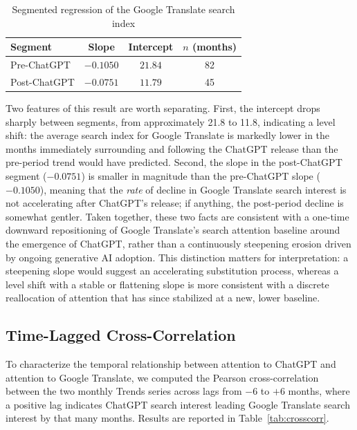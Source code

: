 \documentclass[11pt]{article}
\begin{document}
\begin{table}[htbp]
\centering
\caption{Segmented regression of the Google Translate search index}
\label{tab:segmented}
\begin{tabular}{lccc}
\toprule
Segment & Slope & Intercept & $n$ (months) \\
\midrule
Pre-ChatGPT  & $-0.1050$ & $21.84$ & 82 \\
Post-ChatGPT & $-0.0751$ & $11.79$ & 45 \\
\bottomrule
\end{tabular}
\end{table}

Two features of this result are worth separating. First, the intercept drops sharply between segments, from approximately 21.8 to 11.8, indicating a level shift: the average search index for Google Translate is markedly lower in the months immediately surrounding and following the ChatGPT release than the pre-period trend would have predicted. Second, the slope in the post-ChatGPT segment ($-0.0751$) is smaller in magnitude than the pre-ChatGPT slope ($-0.1050$), meaning that the \emph{rate} of decline in Google Translate search interest is not accelerating after ChatGPT's release; if anything, the post-period decline is somewhat gentler. Taken together, these two facts are consistent with a one-time downward repositioning of Google Translate's search attention baseline around the emergence of ChatGPT, rather than a continuously steepening erosion driven by ongoing generative AI adoption. This distinction matters for interpretation: a steepening slope would suggest an accelerating substitution process, whereas a level shift with a stable or flattening slope is more consistent with a discrete reallocation of attention that has since stabilized at a new, lower baseline.

\subsection{Time-Lagged Cross-Correlation}

To characterize the temporal relationship between attention to ChatGPT and attention to Google Translate, we computed the Pearson cross-correlation between the two monthly Trends series across lags from $-6$ to $+6$ months, where a positive lag indicates ChatGPT search interest leading Google Translate search interest by that many months. Results are reported in Table~\ref{tab:crosscorr}.
\end{document}

